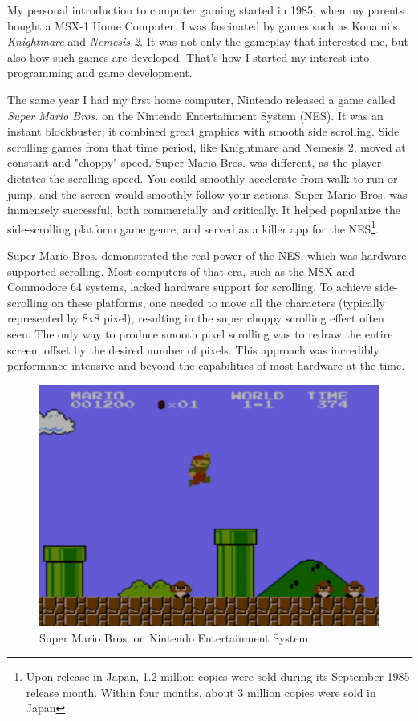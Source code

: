\documentclass[book.tex]{subfiles}
\begin{document}
My personal introduction to computer gaming started in 1985, when my parents bought a MSX-1 Home Computer. I was fascinated by games such as Konami's \textit{Knightmare} and \textit{Nemesis 2}. It was not only the gameplay that interested me, but also how such games are developed. That's how I started my interest into programming and game development.\\
\par
The same year I had my first home computer, Nintendo released a game called \textit{Super Mario Bros.} on the Nintendo Entertainment System (NES). It was an instant blockbuster; it combined great graphics with smooth side scrolling. Side scrolling games from that time period, like Knightmare and Nemesis 2, moved at constant and "choppy" speed. Super Mario Bros. was different, as the player dictates the scrolling speed. You could smoothly accelerate from walk to run or jump, and the screen would smoothly follow your actions. Super Mario Bros. was immensely successful, both commercially and critically. It helped popularize the side-scrolling platform game genre, and served as a killer app for the NES\footnote{Upon release in Japan, 1.2 million copies were sold during its September 1985 release month. Within four months, about 3 million copies were sold in Japan}.\\

\par
Super Mario Bros. demonstrated the real power of the NES, which was hardware-supported scrolling. Most computers of that era, such as the MSX and Commodore 64 systems, lacked hardware support for scrolling. To achieve side-scrolling on these platforms, one needed to move all the characters (typically represented by 8x8 pixel), resulting in the super choppy scrolling effect often seen. The only way to produce smooth pixel scrolling was to redraw the entire screen, offset by the desired number of pixels. This approach was incredibly performance intensive and beyond the capabilities of most hardware at the time.\\

\begin{figure}[H]
  \centering
 \includegraphics[width=1.0\textwidth]{screenshots_300dpi/Mario_Bros.png}
\caption{Super Mario Bros. on Nintendo Entertainment System}
\end{figure}
\end{document}
